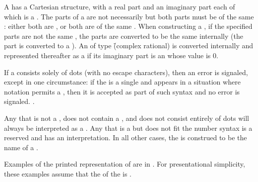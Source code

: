 A  has a Cartesian structure, 
with a real part and an imaginary part each of which is a 
.
The parts of a  are not necessarily  
but both parts must be of the same : 
either both are , or both are of the same  .
When constructing a , if the specified parts are not the
same , the parts are converted to be the same 
internally (\ie the  part is converted to a ). 
An  of type \f{(complex rational)} is converted internally
and represented thereafter as a  if its imaginary part is an 
 whose value is 0.

\endsubsubsection%

\endsubsection%


If a  consists solely of dots (with no escape characters),
then an error  is signaled,
except in one circumstance:
if the  is a single 
and appears in a situation where  notation permits a ,
then it is accepted as part of such syntax and no error is signaled. 
\Seesection\LeftParen.

\endsubsection%


Any  that is not a ,
does not contain a ,
and does not consist entirely of dots
will always be interpreted as a .
Any  that is a  but does not fit the       
number syntax is a reserved  and
has an  interpretation.
In all other cases, the  is construed to be the name of a .

Examples of the printed representation of  are in \thenextfigure. 
For presentational simplicity,
these examples assume that
the  of the  is .

